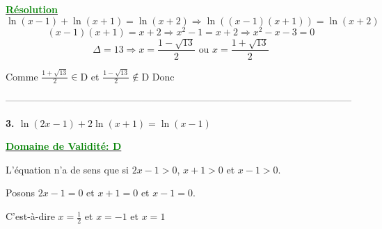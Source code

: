\documentclass[12pt]{article}
\begin{document}
\textbf{\underline{\textcolor{green}{Résolution}}}
\[
\ln(x-1)+\ln(x+1)=\ln(x+2)\Longrightarrow \ln((x-1)(x+1))=\ln(x+2)
\]
\[
(x-1)(x+1)=x+2 \Longrightarrow x^2-1=x+2 \Longrightarrow x^2-x-3=0
\]
\[
\Delta=13 \Longrightarrow x=\frac{1-\sqrt{13}}{2} \text{ ou } x=\frac{1+\sqrt{13}}{2}
\]

Comme $\frac{1+\sqrt{13}}{2}\in$D et $\frac{1-\sqrt{13}}{2}\notin$D Donc \textcolor{green}{}

-----------------------------------------------------------------------------------------------------------

\textbf{3. \(\ln(2x-1)+2\ln(x+1)=\ln(x-1)\)}

\textbf{\underline{\textcolor{green}{Domaine de Validité: D}}}

L'équation n'a de sens que si \(2x-1>0\), \(x+1>0\) et \(x-1>0\).

Posons \(2x-1=0\) et \(x+1=0\) et \(x-1=0\).

C'est-à-dire \(x=\frac{1}{2}\) et \(x=-1\) et \(x=1\)
\end{document}
